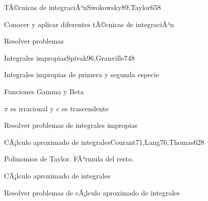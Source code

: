 \begin{syllabus}
\begin{unit}{TÃ©cnicas de integraciÃ³n}{Swokowsky89,Taylor65}{8}
\begin{unitgoals}
	\item Conocer y aplicar diferentes tÃ©cnicas de integraciÃ³n
	\item Resolver problemas
\end{unitgoals}
\end{unit}

\begin{unit}{Integrales impropias}{Spivak96,Granville74}{8}
\begin{topics}
	\item Integrales impropias de primera y segunda especie
	\item Funciones Gamma y Beta
	\item $\pi$ es irracional y $e$ es trascendente
\end{topics}

\begin{unitgoals}
	\item Resolver problemas de integrales impropias
\end{unitgoals}
\end{unit}

\begin{unit}{CÃ¡lculo aproximado de integrales}{Courant71,Lang76,Thomas62}{8}
\begin{topics}
      \item Polinomios de Taylor. FÃ³rmula del resto.
      \item CÃ¡lculo aproximado de integrales
  \end{topics}

   \begin{unitgoals}
      \item Resolver problemas de cÃ¡lculo aproximado de integrales
   \end{unitgoals}
\end{unit}

\begin{coursebibliography}
\end{coursebibliography}
\end{syllabus}
